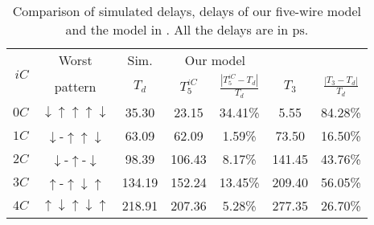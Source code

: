 \documentclass[10pt,journal]{IEEEtran}
\begin{document}
\begin{table}
\caption{Comparison of simulated delays, delays of our five-wire model and the model in \cite{Sot01}. All the delays are in $\mathrm{ps}$.}\label{tab:2}
\begin{center}
\begin{tabular}{|r|c|c|c|c|c|c|}
\hline
\multirow{2}{*}{$iC$}& Worst & Sim. & \multicolumn{2}{|c|}{Our model} & \multicolumn{2}{|c|}{\cite{Sot01}}\\
\cline{3-7} & pattern & $T_d$ & $T^{iC}_5$ & $\frac{|T^{iC}_5-T_d|}{T_d}$ & $T_3$ &  $\frac{|T_3-T_d|}{T_d}$\\
\hline
$0C$ & $\downarrow \uparrow \uparrow \uparrow \downarrow$ & 35.30 & 23.15 & 34.41\% & 5.55 & 84.28\%\\
\hline
$1C$ & $\downarrow$-$\uparrow \uparrow \downarrow$ & 63.09 & 62.09 & 1.59\% & 73.50  & 16.50\%\\
\hline
$2C$ & $\downarrow$-$\uparrow$-$\downarrow$ & 98.39 & 106.43 &  8.17\% & 141.45 & 43.76\%\\
\hline
$3C$ & $\uparrow$-$\uparrow \downarrow \uparrow$ & 134.19 & 152.24 &  13.45\% & 209.40 & 56.05\%\\
\hline
$4C$ & $\uparrow \downarrow \uparrow \downarrow \uparrow$ & 218.91 & 207.36 & 5.28\% & 277.35  & 26.70\%\\
\hline
\end{tabular}
\end{center}
\end{table}
\end{document}
